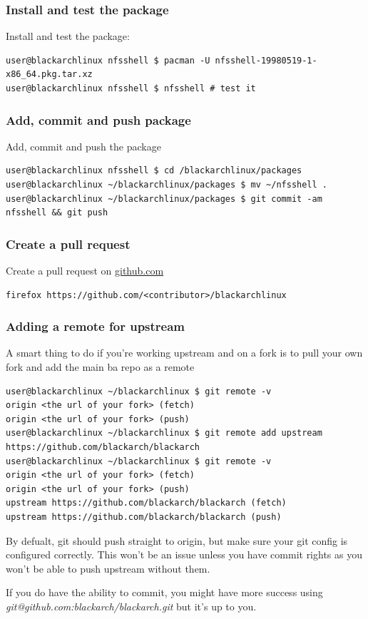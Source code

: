 \documentclass[a4paper, oneside, 11pt]{book}
\begin{document}
\subsubsection{Install and test the package}
Install and test the package:
{\small
\color{gray}
\begin{verbatim}
user@blackarchlinux nfsshell $ pacman -U nfsshell-19980519-1-x86_64.pkg.tar.xz
user@blackarchlinux nfsshell $ nfsshell # test it
\end{verbatim}
}

\subsubsection{Add, commit and push package}
Add, commit and push the package
{\small
\color{gray}
\begin{verbatim}
user@blackarchlinux nfsshell $ cd /blackarchlinux/packages
user@blackarchlinux ~/blackarchlinux/packages $ mv ~/nfsshell .
user@blackarchlinux ~/blackarchlinux/packages $ git commit -am nfsshell && git push
\end{verbatim}
}

\subsubsection{Create a pull request}
Create a pull request on \href{https://github.com/}{github.com}
{\small
\color{gray}
\begin{verbatim}
firefox https://github.com/<contributor>/blackarchlinux
\end{verbatim}
}

\subsubsection{Adding a remote for upstream}
A smart thing to do if you're working upstream and on a fork is to pull your own fork and add the main ba repo as a remote
{\small
\color{gray}
\begin{verbatim}
user@blackarchlinux ~/blackarchlinux $ git remote -v
origin <the url of your fork> (fetch)
origin <the url of your fork> (push)
user@blackarchlinux ~/blackarchlinux $ git remote add upstream https://github.com/blackarch/blackarch
user@blackarchlinux ~/blackarchlinux $ git remote -v
origin <the url of your fork> (fetch)
origin <the url of your fork> (push)
upstream https://github.com/blackarch/blackarch (fetch)
upstream https://github.com/blackarch/blackarch (push)
\end{verbatim}
By defualt, git should push straight to origin, but make sure your git config is configured correctly. This won't be an issue unless you have commit rights as you won't be able to push upstream without them.

If you do have the ability to commit, you might have more success using \textit{git@github.com:blackarch/blackarch.git} but it's up to you.
}
\end{document}
